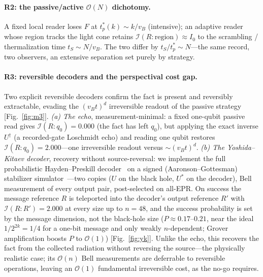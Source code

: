\documentclass[aps,prxquantum,twocolumn,superscriptaddress,longbibliography]{revtex4-2}
\newcommand{\vB}{v_{B}}
\newcommand{\I}{\mathcal{I}}
\begin{document}
\paragraph{R2: the passive/active $\mathcal{O}(N)$ dichotomy.}
A fixed local reader loses $F$ at $t^{*}_{p}(k)\sim k/\vB$ (intensive); an adaptive reader whose
region tracks the light cone retains $\I(R{:}\mathrm{region})\approx I_{0}$ to the scrambling /
thermalization time $t_{S}\sim N/\vB$. The two differ by $t_{S}/t^{*}_{p}\sim N$---the same record,
two observers, an extensive separation set purely by strategy.

\paragraph{R3: reversible decoders and the perspectival cost gap.}
Two explicit reversible decoders confirm the fact is present and reversibly extractable, evading
the $(\vB t)^{d}$ irreversible readout of the passive strategy [Fig.~\ref{fig:m3}]. \emph{(a) The
echo}, measurement-minimal: a fixed one-qubit passive read gives $\I(R{:}q_{0})=0.000$ (the fact
has left $q_{0}$), but applying the exact inverse $U^{\dagger}$ (a recorded-gate Loschmidt echo) and
reading one qubit restores $\I(R{:}q_{0})=2.000$---one irreversible readout versus $\sim(\vB t)^{d}$.
\emph{(b) The Yoshida--Kitaev decoder}, recovery without source-reversal: we implement the full
probabilistic Hayden--Preskill decoder~\cite{yoshida2017} on a signed (Aaronson--Gottesman)
stabilizer simulator~\cite{aaronson2004}---two copies ($U$ on the black hole, $U^{*}$ on the
decoder), Bell measurement of every output pair, post-selected on all-EPR. On success the message
reference $R$ is teleported into the decoder's output reference $R'$ with
$\I(R{:}R')=2.000$ at every size up to $n=48$, and the success probability is set by the message
dimension, not the black-hole size ($P\approx0.17$--$0.21$, near the ideal $1/2^{2k}=1/4$ for a
one-bit message and only weakly $n$-dependent; Grover amplification boosts $P$ to $\mathcal{O}(1)$)
[Fig.~\ref{fig:yk}]. Unlike the echo, this recovers the fact from the collected radiation without
reversing the source---the physically realistic case; its $\mathcal{O}(n)$ Bell measurements are
deferrable to reversible operations, leaving an $\mathcal{O}(1)$ fundamental irreversible cost, as
the no-go requires.
\end{document}
